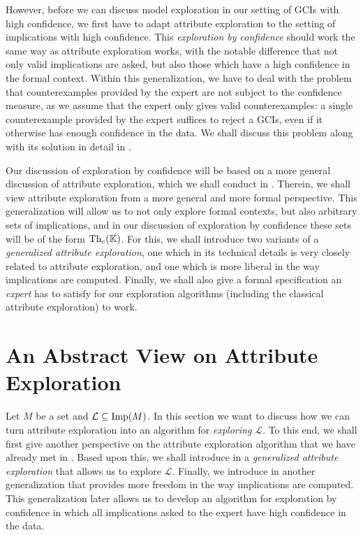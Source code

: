 However, before we can discuss model exploration in our setting of GCIs with high
confidence, we first have to adapt attribute exploration to the setting of implications
with high confidence.  This \emph{exploration by confidence} should work the same way as
attribute exploration works, with the notable difference that not only valid implications
are asked, but also those which have a high confidence in the formal context.  Within this
generalization, we have to deal with the problem that counterexamples provided by the
expert are not subject to the confidence measure, as we assume that the expert only gives
valid counterexamples: a single counterexample provided by the expert suffices to reject a
GCIs, even if it otherwise has enough confidence in the data.  We shall discuss this
problem along with its solution in detail in .

Our discussion of exploration by confidence will be based on a more general discussion of
attribute exploration, which we shall conduct in .  Therein, we
shall view attribute exploration from a more general and more formal perspective.  This
generalization will allow us to not only explore formal contexts, but also arbitrary sets
of implications, and in our discussion of exploration by confidence these sets will be of
the form $\operatorname{Th}_c({\mathbb{K}})$.  For this, we shall introduce two variants of a
\emph{generalized attribute exploration}, one which in its technical details is very
closely related to attribute exploration, and one which is more liberal in the way
implications are computed.  Finally, we shall also give a formal specification an
\emph{expert} has to satisfy for our exploration algorithms (including the classical
attribute exploration) to work.

\section{An Abstract View on Attribute Exploration}
\label{sec:an-abstract-view}

Let $M$ be a set and $\mathcal{L} \subseteq \operatorname{Imp}(M)$.  In this section we want to discuss
how we can turn attribute exploration into an algorithm for \emph{exploring
  $\mathcal{L}$}.  To this end, we shall first give another perspective on the attribute
exploration algorithm that we have already met in .  Based upon this,
we shall introduce in  a \emph{generalized attribute
  exploration} that allows us to explore $\mathcal{L}$.  Finally, we introduce in
 another generalization that provides more freedom in the way
implications are computed.  This generalization later allows us to develop an algorithm
for exploration by confidence in which all implications asked to the expert have high
confidence in the data.

